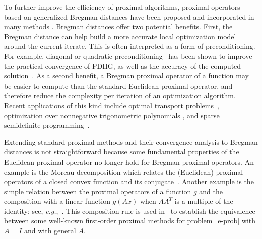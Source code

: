 \documentclass[letterpaper,11pt]{article}
\begin{document}
To further improve the efficiency of proximal algorithms, 
proximal operators based on generalized Bregman distances have 
been proposed and incorporated in many methods
\cite{ChT:93,Eck:93,Gul:94,AuT:06,Tse:08,BBT17,BSTV18,LFN18,Teboulle18}. 
Bregman distances offer two potential benefits.
First, the Bregman distance can help build a more accurate local
optimization model around the current iterate.
This is often interpreted as a form of preconditioning.  For example,
diagonal or quadratic preconditioning~\cite{PC11,JLLO19,LXY21}
has been shown to improve the practical convergence of PDHG,
as well as the accuracy of the computed solution~\cite{ADH+:21}.
As a second benefit, a Bregman proximal operator of a 
function may be easier to compute than 
the standard Euclidean proximal operator, and therefore
reduce the complexity per iteration of an optimization algorithm.
Recent applications of this kind include optimal transport 
problems~\cite{CLMW19}, optimization over nonnegative trigonometric 
polynomials \cite{ChV:18},
and sparse semidefinite programming~\cite{JV22}.

Extending standard proximal methods and their convergence analysis
to Bregman distances is not straightforward because some fundamental
properties of the Euclidean proximal operator no longer hold
for Bregman proximal operators.
An example is the Moreau decomposition
which relates the (Euclidean) proximal operators of a closed convex 
function and its conjugate~\cite{Mor:65}.
Another example is the simple relation between
the proximal operators of a function $g$ and 
the composition with a linear function $g(Ax)$ 
when $AA^T$ is a multiple of the identity;
see, \emph{e.g.},~\cite{CP11b,Beck17}.
This composition rule is used in~\cite{OV20}
to establish the equivalence between some well-known first-order proximal 
methods for problem~\eqref{e-prob} with $A=I$ and with general $A$.
\end{document}
